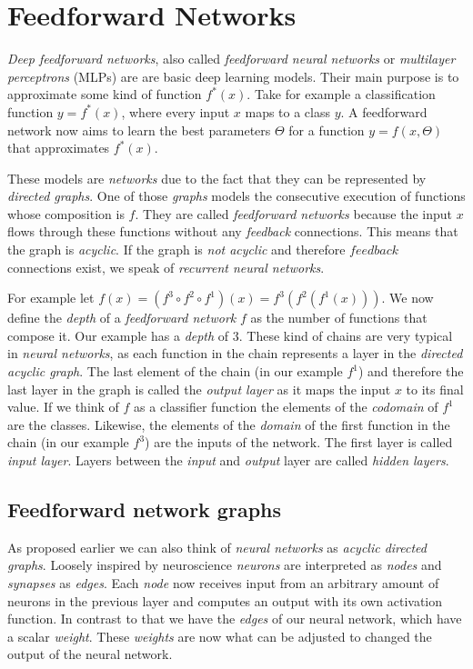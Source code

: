 \section{Feedforward Networks}
\emph{Deep feedforward networks}, also called \emph{feedforward neural networks} or \emph{multilayer perceptrons} (MLPs) are are basic deep learning models.
Their main purpose is to approximate some kind of function \(f^*(x)\).
Take for example a classification function \(y = f^*(x)\), where every input \(x\) maps to a class \(y\).
A feedforward network now aims to learn the best parameters \(\Theta\) for a function \(y = f(x, \Theta)\) that approximates \(f^*(x)\).

These models are \emph{networks} due to the fact that they can be represented by \emph{directed graphs}.
One of those \emph{graphs} models the consecutive execution of functions whose composition is \(f\).
They are called \emph{feedforward networks} because the input \(x\) flows through these functions without any \emph{feedback} connections.
This means that the graph is \emph{acyclic}.
If the graph is \emph{not acyclic} and therefore \(feedback\) connections exist, we speak of \emph{recurrent neural networks}.

For example let \(f(x) = (f^3 \circ f^2 \circ f^1)(x) = f^3(f^2(f^1(x)))\).
We now define the \emph{depth} of a \emph{feedforward network} \(f\) as the number of functions that compose it.
Our example has a \emph{depth} of \(3\).
These kind of chains are very typical in \emph{neural networks}, as each function in the chain represents a layer in the \emph{directed acyclic graph}.
The last element of the chain (in our example \(f^1\)) and therefore the last layer in the graph is called the \emph{output layer} as it maps the input \(x\) to its final value.
If we think of \(f\) as a classifier function the elements of the \emph{codomain} of \(f^1\) are the classes.
Likewise, the elements of the \emph{domain} of the first function in the chain (in our example \(f^3\)) are the inputs of the network.
The first layer is called \emph{input layer}.
Layers between the \emph{input} and \emph{output} layer are called \emph{hidden layers}.

\subsection{Feedforward network graphs}
As proposed earlier we can also think of \emph{neural networks} as \emph{acyclic directed graphs}.
Loosely inspired by neuroscience \emph{neurons} are interpreted as \emph{nodes} and \emph{synapses} as \emph{edges}.
Each \emph{node} now receives input from an arbitrary amount of neurons in the previous layer and computes an output with its own activation function.
In contrast to that we have the \emph{edges} of our neural network, which have a scalar \emph{weight}.
These \emph{weights} are now what can be adjusted to changed the output of the neural network.

